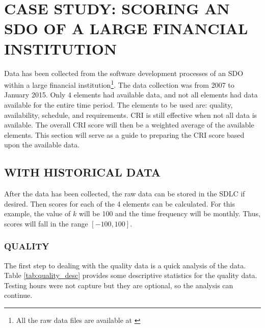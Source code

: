 \documentclass[SDSUThesis.tex]{subfiles}
\begin{document}
\section{CASE STUDY: SCORING AN SDO OF A LARGE FINANCIAL INSTITUTION}

    Data has been collected from the software development processes of
    an SDO within a large financial institution\footnote{All the raw data 
    files are available at \cite{Swanstrom2015}}.
    The data collection was from 2007 to January 2015. Only 4 elements had available
    data, and not all elements had data available for the entire time period.  The
    elements to be used are: quality, availability, schedule, and requirements.
    CRI is still effective when not all data is available.
    The overall CRI score will then be a 
    weighted average of the available elements. 
    This section will serve as a guide to preparing the CRI score
    based upon the available data.  

    \subsection{WITH HISTORICAL DATA}
        After the data has been collected, the raw data can be stored in the SDLC
        if desired.  Then scores for each of the 4 elements can be calculated.
        For this example, the value of $k$ will be 100 and the time
        frequency will be monthly.  Thus, scores will fall
        in the range $[-100,100]$.
        \subsubsection{QUALITY}
            The first step to dealing with the quality data is a quick
            analysis of the data.  Table \ref{tab:quality_desc} provides
            some descriptive statistics for the quality data.  Testing hours
            were not capture but they are optional, so the analysis can 
            continue.
            
\end{document}
